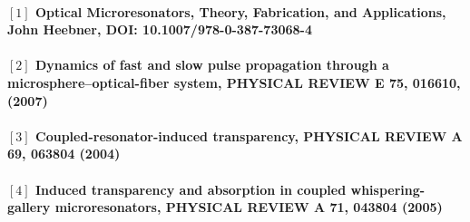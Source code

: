 \paragraph{\normalfont \large $[1]$ Optical Microresonators, Theory, Fabrication, and Applications, John Heebner, DOI: 10.1007/978-0-387-73068-4\\
\\ $[2]$ Dynamics of fast and slow pulse propagation through a microsphere–optical-fiber system, PHYSICAL REVIEW E 75, 016610, (2007)\\
\\ $[3]$ Coupled-resonator-induced transparency, PHYSICAL REVIEW A 69, 063804 (2004)\\
\\ $[4]$ Induced transparency and absorption in coupled whispering-gallery microresonators, PHYSICAL REVIEW A 71, 043804 (2005)}

